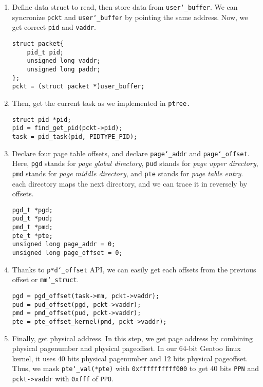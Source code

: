 \begin{enumerate}
\item Define data struct to read, then store data from \texttt{user\char`_buffer}.
We can syncronize \texttt{pckt} and \texttt{user\char`_buffer} by pointing the same address.
Now, we get correct \texttt{pid} and \texttt{vaddr}.
\begin{lstlisting}
struct packet{
    pid_t pid;
    unsigned long vaddr;
    unsigned long paddr;
};
pckt = (struct packet *)user_buffer;
\end{lstlisting}

\item Then, get the current task as we implemented in \texttt{ptree.}
\begin{lstlisting}
struct pid *pid;
pid = find_get_pid(pckt->pid);
task = pid_task(pid, PIDTYPE_PID);
\end{lstlisting}

\item Declare four page table offsets, and declare \texttt{page\char`_addr} and \texttt{page\char`_offset}.
Here, \texttt{pgd} stands for \textit{page global directory}, \texttt{pud} stands for \textit{page upper directory}, \texttt{pmd} stands for \textit{page middle directory}, and \texttt{pte} stands for \textit{page table entry}.
each directory maps the next directory, and we can trace it in reversely by offsets.
\begin{lstlisting}
pgd_t *pgd;
pud_t *pud;
pmd_t *pmd;
pte_t *pte;
unsigned long page_addr = 0;
unsigned long page_offset = 0;
\end{lstlisting}

\item Thanks to \texttt{p*d\char`_offset} API, we can easily get each offsets from the previous offset or \texttt{mm\char`_struct}.
\begin{lstlisting}
pgd = pgd_offset(task->mm, pckt->vaddr);
pud = pud_offset(pgd, pckt->vaddr);
pmd = pmd_offset(pud, pckt->vaddr);
pte = pte_offset_kernel(pmd, pckt->vaddr);
\end{lstlisting}

\item Finally, get physical address.
In this step, we get page address by combining physical pagenumber and physical pageoffset.
In our 64-bit Gentoo linux kernel, it uses 40 bits physical pagenumber and 12 bits physical pageoffset.
Thus, we mask \texttt{pte\char`_val(*pte)} with \texttt{0xffffffffff000} to get 40 bits \texttt{PPN} and \texttt{pckt->vaddr} with \texttt{0xfff} of \texttt{PPO}.


\end{enumerate}
